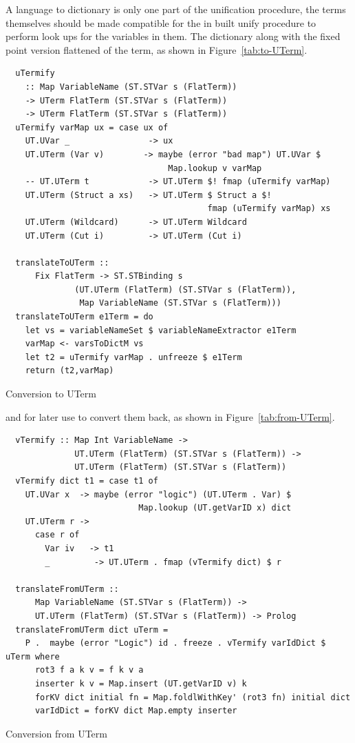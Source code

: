 \documentclass[thesis-solanki.tex]{subfiles}
\begin{document}
A language to  dictionary is only one part of the unification procedure, the terms themselves should be made
compatible for the in built unify procedure to perform look ups for the variables in them.
The dictionary along with the fixed point version flattened of the term, as shown in Figure~\ref{tab:to-UTerm}.
%
\begin{code-list}[H]
  \begin{verbatim}
  uTermify
    :: Map VariableName (ST.STVar s (FlatTerm))
    -> UTerm FlatTerm (ST.STVar s (FlatTerm))
    -> UTerm FlatTerm (ST.STVar s (FlatTerm))
  uTermify varMap ux = case ux of
    UT.UVar _                -> ux
    UT.UTerm (Var v)        -> maybe (error "bad map") UT.UVar $
                                 Map.lookup v varMap
    -- UT.UTerm t            -> UT.UTerm $! fmap (uTermify varMap)
    UT.UTerm (Struct a xs)   -> UT.UTerm $ Struct a $!
                                         fmap (uTermify varMap) xs
    UT.UTerm (Wildcard)      -> UT.UTerm Wildcard
    UT.UTerm (Cut i)         -> UT.UTerm (Cut i)

  translateToUTerm ::
      Fix FlatTerm -> ST.STBinding s
              (UT.UTerm (FlatTerm) (ST.STVar s (FlatTerm)),
               Map VariableName (ST.STVar s (FlatTerm)))
  translateToUTerm e1Term = do
    let vs = variableNameSet $ variableNameExtractor e1Term
    varMap <- varsToDictM vs
    let t2 = uTermify varMap . unfreeze $ e1Term
    return (t2,varMap)
  \end{verbatim}
  \caption{Conversion to UTerm}
  \label{tab:to-UTerm}
\end{code-list}
%
and for later use to convert them back, as shown in Figure~\ref{tab:from-UTerm}.
%
\begin{code-list}[H]
  \begin{verbatim}
  vTermify :: Map Int VariableName ->
              UT.UTerm (FlatTerm) (ST.STVar s (FlatTerm)) ->
              UT.UTerm (FlatTerm) (ST.STVar s (FlatTerm))
  vTermify dict t1 = case t1 of
    UT.UVar x  -> maybe (error "logic") (UT.UTerm . Var) $
                           Map.lookup (UT.getVarID x) dict
    UT.UTerm r ->
      case r of
        Var iv   -> t1
        _         -> UT.UTerm . fmap (vTermify dict) $ r

  translateFromUTerm ::
      Map VariableName (ST.STVar s (FlatTerm)) ->
      UT.UTerm (FlatTerm) (ST.STVar s (FlatTerm)) -> Prolog
  translateFromUTerm dict uTerm =
    P .  maybe (error "Logic") id . freeze . vTermify varIdDict $ uTerm where
      rot3 f a k v = f k v a
      inserter k v = Map.insert (UT.getVarID v) k
      forKV dict initial fn = Map.foldlWithKey' (rot3 fn) initial dict
      varIdDict = forKV dict Map.empty inserter
  \end{verbatim}
  \caption{Conversion from UTerm}
  \label{tab:from-UTerm}
\end{code-list}
\end{document}

